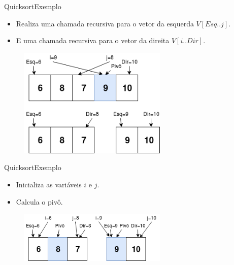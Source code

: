 \documentclass[aspectratio=169]{beamer}
\begin{document}

\begin{frame}{Quicksort}{Exemplo}
\begin{itemize}
 \item Realiza uma chamada recursiva para o vetor da esquerda $V[Esq..j]$.
 \item E uma chamada recursiva para o vetor da direita $V[i..Dir]$.
\end{itemize}

\begin{figure}[!h]
  \centering
  \includegraphics[width=200pt]{imgs/quick/quick36.png}
  \label{fig_quick36}
\end{figure}

\end{frame}



\begin{frame}{Quicksort}{Exemplo}
\begin{itemize}
 \item Inicializa as variáveis $i$ e $j$.
 \item Calcula o pivô.
\end{itemize}

\begin{figure}[!h]
  \centering
  \includegraphics[width=200pt]{imgs/quick/quick37.png}
  \label{fig_quick37}
\end{figure}

\end{frame}


\end{document}

